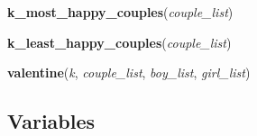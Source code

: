     \label{utility:k_most_happy_couples}

    \vspace{0.5ex}

\hspace{.8\funcindent}\begin{boxedminipage}{\funcwidth}

    \raggedright \textbf{k\_most\_happy\_couples}(\textit{couple\_list})

\setlength{\parskip}{2ex}
\setlength{\parskip}{1ex}
    \end{boxedminipage}

    \label{utility:k_least_happy_couples}

    \vspace{0.5ex}

\hspace{.8\funcindent}\begin{boxedminipage}{\funcwidth}

    \raggedright \textbf{k\_least\_happy\_couples}(\textit{couple\_list})

\setlength{\parskip}{2ex}
\setlength{\parskip}{1ex}
    \end{boxedminipage}

    \label{utility:valentine}

    \vspace{0.5ex}

\hspace{.8\funcindent}\begin{boxedminipage}{\funcwidth}

    \raggedright \textbf{valentine}(\textit{k}, \textit{couple\_list}, \textit{boy\_list}, \textit{girl\_list})

\setlength{\parskip}{2ex}
\setlength{\parskip}{1ex}
    \end{boxedminipage}



  \subsection{Variables}


